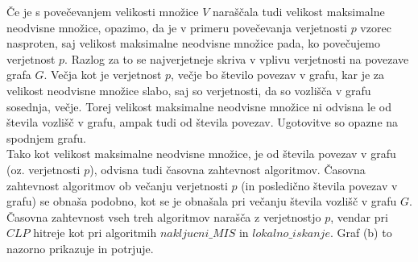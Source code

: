 \documentclass[a4paper, 12pt]{article}
\begin{document}
\noindent Če je s povečevanjem velikosti množice $V$ naraščala tudi velikost maksimalne neodvisne množice, opazimo, da je v primeru povečevanja verjetnosti $p$ vzorec nasproten, saj
velikost maksimalne neodvisne množice pada, ko povečujemo verjetnost $p$. Razlog za to se najverjetneje skriva v vplivu verjetnosti na povezave grafa $G$. 
Večja kot je verjetnost $p$, večje bo število povezav v grafu, kar je za velikost neodvisne množice slabo, saj so verjetnosti, da so vozlišča v grafu sosednja, večje. 
Torej velikost maksimalne neodvisne množice ni odvisna le od števila vozlišč v grafu, ampak tudi od števila povezav. Ugotovitve so opazne na spodnjem grafu.\\


\noindent Tako kot velikost maksimalne neodvisne množice, je od števila povezav v grafu (oz. verjetnosti $p$), odvisna tudi časovna zahtevnost algoritmov. Časovna zahtevnost algoritmov ob večanju verjetnosti $p$ 
(in posledično števila povezav v grafu) se obnaša podobno, kot se je obnašala pri večanju števila vozlišč v grafu $G$. Časovna zahtevnost vseh treh algoritmov narašča z verjetnostjo $p$, vendar pri $CLP$ hitreje kot pri algoritmih
$nakljucni\_MIS$ in $lokalno\_iskanje$. Graf (b) to nazorno prikazuje in potrjuje.

\end{document}
